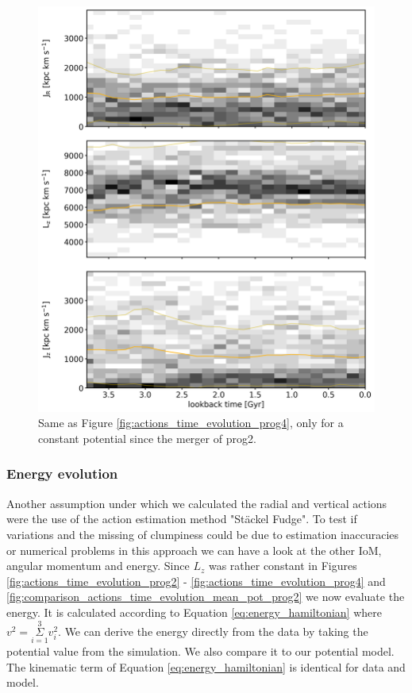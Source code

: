 \begin{figure}[htbp]
\captionsetup{format=plain}
    \centering
	\includegraphics[width=\textwidth]{plots/Dynamics/mean_pot/action_time_evolution_hist_mean_prog4.png}
    \caption{Same as Figure \ref{fig:actions_time_evolution_prog4}, only for a constant potential since the merger of prog2.}\label{fig:actions_time_evolution_mean_pot_prog4}
\end{figure}
\fi

\subsubsection{Energy evolution}\label{subsubsec:energy_evol}
Another assumption under which we calculated the radial and vertical actions were the use of the action estimation method "St\"ackel Fudge". To test if variations and the missing of clumpiness could be due to estimation inaccuracies or numerical problems in this approach we can have a look at the other \ac{IoM}, angular momentum and energy. Since $L_z$ was rather constant in Figures \ref{fig:actions_time_evolution_prog2} - \ref{fig:actions_time_evolution_prog4} and \ref{fig:comparison_actions_time_evolution_mean_pot_prog2} we now evaluate the energy. It is calculated according to Equation \ref{eq:energy_hamiltonian} where $v^2 = \Sigma\limits_{i=1}^3 v_i^2$. We can derive the energy directly from the data by taking the potential value from the simulation. We also compare it to our potential model. The kinematic term of Equation \ref{eq:energy_hamiltonian} is identical for data and model.

